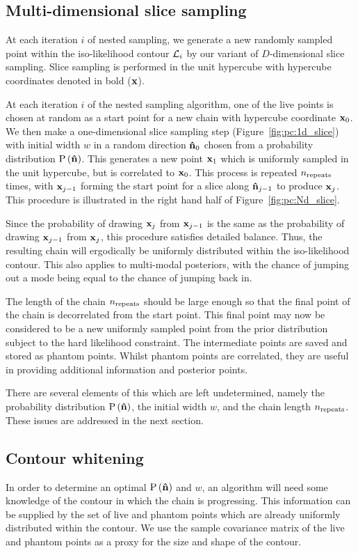 \subsection{Multi-dimensional slice sampling}
\label{sec:pc:multi_slice}
At each iteration $i$ of nested sampling, we generate a new randomly sampled point within the iso-likelihood contour $\mathcal{L}_i$ by our variant of $D$-dimensional slice sampling.
Slice sampling is performed in the unit hypercube with hypercube coordinates denoted in bold ($\mathbf{x}$).

At each iteration $i$ of the nested sampling algorithm, one of the live points is chosen at random as a start point for a new chain with hypercube coordinate $\mathbf{x}_{0}$. We then make a one-dimensional slice sampling step (Figure~\ref{fig:pc:1d_slice}) with initial width $w$ in a random direction $\mathbf{\hat{n}}_{0}$ chosen from a probability distribution $\mathrm{P}\left(\mathbf{\hat{n}}\right)$. This generates a new point $\mathbf{x}_{1}$ which is uniformly sampled in the unit hypercube, but is correlated to $\mathbf{x}_{0}$. This process is repeated $n_{\mathrm{repeats}}$ times, with $\mathbf{x}_{j-1}$ forming the start point for a slice along $\mathbf{\hat{n}}_{j-1}$ to produce $\mathbf{x}_{j}$. This procedure is illustrated in the right hand half of Figure~\ref{fig:pc:Nd_slice}.

Since the probability of drawing $\mathbf{x}_{j}$ from $\mathbf{x}_{j-1}$ is the same as the probability of drawing $\mathbf{x}_{j-1}$ from $\mathbf{x}_{j}$, this procedure satisfies detailed balance. Thus, the resulting chain will ergodically be uniformly distributed within the iso-likelihood contour. This also applies to multi-modal posteriors, with the chance of jumping out a mode being equal to the chance of jumping back in.

The length of the chain $n_{\mathrm{repeats}}$ should be large enough so that the final point of the chain is decorrelated from the start point. 
This final point may now be considered to be a new uniformly sampled point from the prior distribution subject to the hard likelihood constraint. The intermediate points are saved and stored as phantom points. Whilst phantom points are correlated, they are useful in providing additional information and posterior points.

There are several elements of this which are left undetermined, namely the probability distribution $\mathrm{P}\left(\mathbf{\hat{n}}\right)$, the initial width $w$, and the chain length $n_{\mathrm{repeats}}$. These issues are addressed in the next section.


\subsection{Contour whitening}
\label{sec:pc:cont_white}
In order to determine an optimal $\mathrm{P}\left(\mathbf{\hat{n}}\right)$ and $w$, an algorithm will need some knowledge of the contour in which the chain is progressing. This information can be supplied by the set of live and phantom points which are already uniformly distributed within the contour. We use the sample covariance matrix of the live and phantom points as a proxy for the size and shape of the contour.


